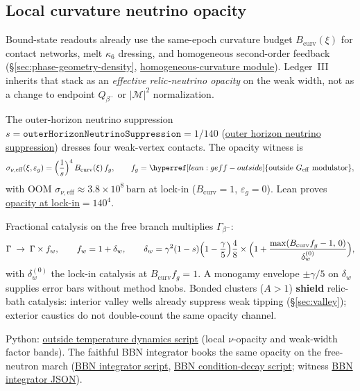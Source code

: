\documentclass[11pt,notitlepage]{amsart}
\begin{document}
\subsection{Local curvature neutrino opacity}
\label{sec:neutrino-opacity}

Bound-state readouts already use the same-epoch curvature budget $B_{\mathrm{curv}}(\xi)$
for contact networks, melt $\kappa_6$ dressing, and homogeneous second-order feedback
(\S\ref{sec:phase-geometry-density}, \hyperref[lean:homogeneous-curvature]{homogeneous-curvature module}).
Ledger~III inherits that stack as an \emph{effective relic-neutrino opacity} on the
weak width, not as a change to endpoint $Q_{\beta^-}$ or $|\mathcal{M}|^2$ normalization.

The outer-horizon neutrino suppression
$s=\texttt{outerHorizonNeutrinoSuppression}=1/140$
(\hyperref[lean:outer-nu-suppression]{outer horizon neutrino suppression}) dresses four
weak-vertex contacts. The opacity witness is
\begin{equation}
  \sigma_{\nu,\mathrm{eff}}(\xi,\varepsilon_g)
    = \Bigl(\frac{1}{s}\Bigr)^{4}\, B_{\mathrm{curv}}(\xi)\, f_g,
  \qquad
  f_g = \hyperref[lean:geff-outside]{\text{outside } G_{\mathrm{eff}} \text{ modulator}},
\end{equation}
with OOM $\sigma_{\nu,\mathrm{eff}}\approx 3.8\times 10^{8}\,\mathrm{barn}$ at lock-in
($B_{\mathrm{curv}}=1$, $\varepsilon_g=0$). Lean proves
\hyperref[lean:nu-opacity-lockin]{opacity at lock-in}$=140^{4}$.

Fractional catalysis on the free branch multiplies $\Gamma_{\beta^-}$:
\begin{equation}
  \Gamma \;\to\; \Gamma \times f_w,
  \qquad
  f_w = 1 + \delta_w,
  \qquad
  \delta_w = \gamma^{2}(1-s)\Bigl(1-\frac{\gamma}{5}\Bigr)\frac{4}{8}
    \times \Bigl(1 + \frac{\max(B_{\mathrm{curv}} f_g - 1,\,0)}{\delta_w^{(0)}}\Bigr),
\end{equation}
with $\delta_w^{(0)}$ the lock-in catalysis at $B_{\mathrm{curv}} f_g=1$.
A monogamy envelope $\pm\gamma/5$ on $\delta_w$ supplies error bars without method knobs.
Bonded clusters ($A>1$) \textbf{shield} relic-bath catalysis: interior valley wells
already suppress weak tipping (\S\ref{sec:valley}); exterior caustics do not double-count
the same opacity channel.

Python: \hyperref[app:scripts]{outside temperature dynamics script}
(local $\nu$-opacity and weak-width factor bands).
The faithful BBN integrator books the same opacity on the free-neutron march
(\hyperref[app:scripts]{BBN integrator script}, \hyperref[app:scripts]{BBN condition-decay script};
witness \hyperref[app:scripts]{BBN integrator JSON}).
\end{document}
